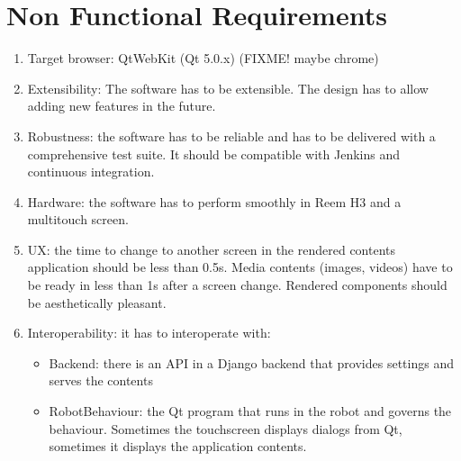\section{Non Functional Requirements}
\begin{enumerate}
    \item Target browser: QtWebKit (Qt 5.0.x) (FIXME! maybe chrome)
    \item Extensibility: The software has to be extensible. The design has to allow adding new features in the future.
    \item Robustness: the software has to be reliable and has to be delivered with a comprehensive test suite. It should be compatible with Jenkins and continuous integration.
    \item Hardware: the software has to perform smoothly in Reem H3 and a multitouch screen.
    \item \ac{UX}: the time to change to another screen in the rendered contents application should be less than 0.5s. Media contents (images, videos) have to be ready in less than 1s after a screen change. Rendered components should be aesthetically pleasant.
    \item Interoperability: it has to interoperate with:
    \begin{itemize}
        \item Backend: there is an \ac{API} in a Django backend that provides settings and serves the contents
        \item RobotBehaviour: the Qt program that runs in the robot and governs the behaviour. Sometimes the touchscreen displays dialogs from Qt, sometimes it displays the application contents. 
    \end{itemize}
\end{enumerate}
